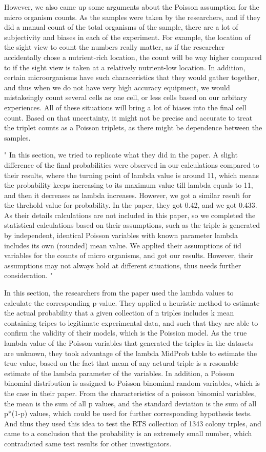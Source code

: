 \documentclass{article}
\begin{document}
However, we also came up some arguments about the Poisson assumption for
the micro organism counts. As the samples were taken by the researchers,
and if they did a manual count of the total organisms of the sample,
there are a lot of subjectivity and biases in each of the experiment.
For example, the location of the sight view to count the numbers really
matter, as if the researcher accidentally chose a nutrient-rich
location, the count will be way higher compared to if the sight view is
taken at a relatively nutrient-low location. In addition, certain
microorganisms have such characeristics that they would gather together,
and thus when we do not have very high accuracy equipment, we would
mistakeingly count several cells as one cell, or less cells based on our
arbitary experiences. All of these situations will bring a lot of biases
into the final cell count. Based on that uncertainty, it might not be
precise and accurate to treat the triplet counts as a Poisson triplets,
as there might be dependence between the samples.

" In this section, we tried to replicate what they did in the paper. A
slight difference of the final probabilities were observed in our
calculations compared to their results, where the turning point of
lambda value is around 11, which means the probability keeps increasing
to its maximum value till lambda equals to 11, and then it decreases as
lambda increases. However, we got a similar result for the threhold
value for probability. In the paper, they got 0.42, and we got 0.433. As
their details calculations are not included in this paper, so we
completed the statistical calculations based on their assumptions, such
as the triple is generated by independent, identical Poisson variables
with known parameter lambda includes its own (rounded) mean value. We
applied their assumptions of iid variables for the counts of micro
organisms, and got our results. However, their assumptions may not
always hold at different situations, thus needs further consideration. "

In this section, the researchers from the paper used the lambda values
to calculate the corresponding p-value. They applied a heuristic method
to estimate the actual probability that a given collection of n triples
includes k mean containing tripes to legitimate experimental data, and
such that they are able to confirm the validity of their models, which
is the Poission model. As the true lambda value of the Poisson variables
that generated the triples in the datasets are unknown, they took
advantage of the lambda MidProb table to estimate the true value, based
on the fact that mean of any actural triple is a resonable estimate of
the lambda parameter of the variables. In addition, a Poisson binomial
distribution is assigned to Poisson binominal random variables, which is
the case in their paper. From the characteristics of a poisson binomial
variables, the mean is the sum of all p values, and the standard
deviation is the sum of all p*(1-p) values, which could be used for
further corresponding hypothesis tests. And thus they used this idea to
test the RTS collection of 1343 colony trples, and came to a conclusion
that the probability is an extremely small number, which contradicted
same test results for other investigators.
\end{document}
